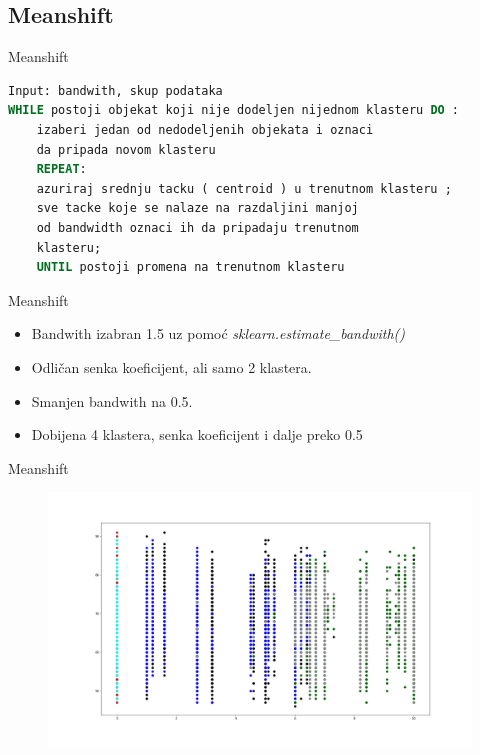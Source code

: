 \documentclass[12pt]{beamer}
\begin{document}
\subsection{Meanshift}
\begin{frame}[fragile]{Meanshift}
\begin{lstlisting}[language=Pascal, basicstyle=\scriptsize]
Input: bandwith, skup podataka
WHILE postoji objekat koji nije dodeljen nijednom klasteru DO :
	izaberi jedan od nedodeljenih objekata i oznaci
	da pripada novom klasteru
	REPEAT:
	azuriraj srednju tacku ( centroid ) u trenutnom klasteru ;
	sve tacke koje se nalaze na razdaljini manjoj
	od bandwidth oznaci ih da pripadaju trenutnom
	klasteru;
	UNTIL postoji promena na trenutnom klasteru
\end{lstlisting}

\end{frame}


\begin{frame}{Meanshift}
\begin{itemize}
\item Bandwith izabran 1.5 uz pomoć
\emph{sklearn.estimate\_bandwith()} \pause
\item Odličan senka koeficijent, ali samo 2 klastera. \pause
\item Smanjen bandwith na 0.5.\pause
\item Dobijena 4 klastera, senka koeficijent i dalje preko 0.5
\end{itemize}
\end{frame}

\begin{frame}{Meanshift}
\begin{figure}
\includegraphics[scale=0.15]{../meanshift_bandwith05}
\end{figure}
\end{frame}
\end{document}

